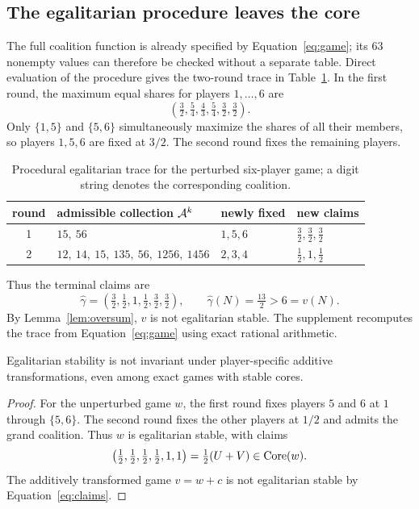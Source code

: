 \subsection{The egalitarian procedure leaves the core}

The full coalition function is already specified by
Equation~\eqref{eq:game}; its $63$ nonempty values can therefore be checked
without a separate table. Direct evaluation of the procedure gives the
two-round trace in Table~\ref{tab:trace}. In the first round, the maximum
equal shares for players $1,\dots,6$ are
\[
 \left(\tfrac32,\tfrac54,\tfrac43,\tfrac54,\tfrac32,\tfrac32\right).
\]
Only $\{1,5\}$ and $\{5,6\}$ simultaneously maximize the shares of all their
members, so players $1,5,6$ are fixed at $3/2$. The second round fixes the
remaining players.

\begin{table}[ht]
\centering
\small
\caption{Procedural egalitarian trace for the perturbed six-player game; a
digit string denotes the corresponding coalition.}
\label{tab:trace}
\begin{tabular}{@{}c p{3.55in} l l@{}}
\toprule
round & admissible collection ${\cal A}^k$
      & newly fixed & new claims\\
\midrule
1 & $15,\ 56$
  & $1,5,6$ & $\tfrac32,\tfrac32,\tfrac32$\\[2pt]
2 & $12,\ 14,\ 15,\ 135,\ 56,\ 1256,\ 1456$
  & $2,3,4$ & $\tfrac12,1,\tfrac12$\\
\bottomrule
\end{tabular}
\end{table}

Thus the terminal claims are
\begin{equation}\label{eq:claims}
 \widehat\gamma
 =\left(\tfrac32,\tfrac12,1,\tfrac12,\tfrac32,\tfrac32\right),
 \qquad
 \widehat\gamma(N)=\tfrac{13}{2}>6=v(N).
\end{equation}
By Lemma~\ref{lem:oversum}, $v$ is not egalitarian stable. The supplement
recomputes the trace from Equation~\eqref{eq:game} using exact rational
arithmetic.

\begin{corollary}\label{cor:noncovariance}
Egalitarian stability is not invariant under player-specific additive
transformations, even among exact games with stable cores.
\end{corollary}

\begin{proof}
For the unperturbed game $w$, the first round fixes players $5$ and $6$ at
$1$ through $\{5,6\}$. The second round fixes the other players at $1/2$ and
admits the grand coalition. Thus $w$ is egalitarian stable, with claims
\[
 \left(\tfrac12,\tfrac12,\tfrac12,\tfrac12,1,1\right)
   =\tfrac12(U+V)\in\operatorname{Core}(w).
\]
The additively transformed game $v=w+c$ is not egalitarian stable by
Equation~\eqref{eq:claims}.
\end{proof}

